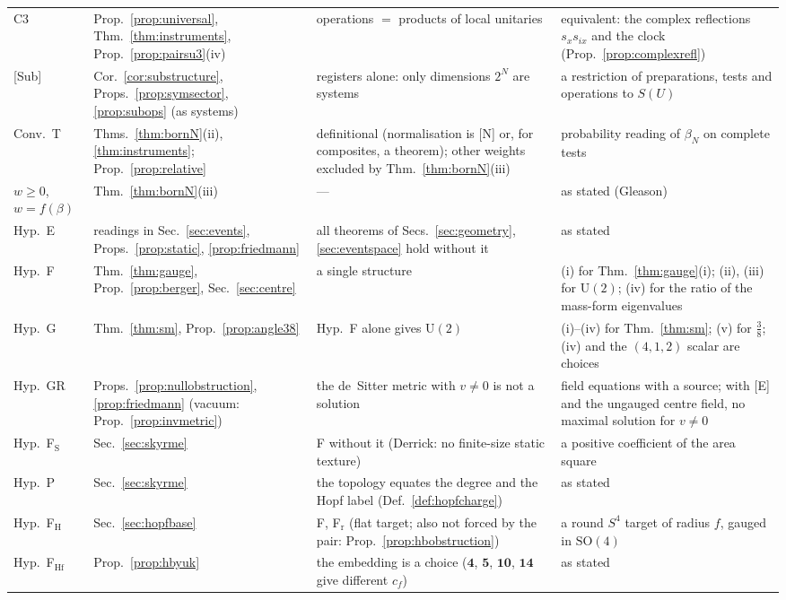 \documentclass[aps,pra,onecolumn,superscriptaddress,nofootinbib,10pt]{revtex4-2}
\theoremstyle{definition}
\theoremstyle{remark}
\newcommand{\SO}{\mathrm{SO}}
\newcommand{\U}{\mathrm{U}}
\begin{document}
\begin{table}[h]
\begin{tabular}{@{}p{}p{}p{}p{}@{}}
C3 & Prop.~\ref{prop:universal}, Thm.~\ref{thm:instruments}, Prop.~\ref{prop:pairsu3}(iv) & operations $=$ products of local unitaries & equivalent: the complex reflections $s_xs_{ix}$ and the clock (Prop.~\ref{prop:complexrefl})\\
{[Sub]} & Cor.~\ref{cor:substructure}, Props.~\ref{prop:symsector}, \ref{prop:subops} (as systems) & registers alone: only dimensions $2^N$ are systems & a restriction of preparations, tests and operations to $S(U)$\\
Conv.\ T & Thms.~\ref{thm:bornN}(ii), \ref{thm:instruments}; Prop.~\ref{prop:relative} & definitional (normalisation is [N] or, for composites, a theorem); other weights excluded by Thm.~\ref{thm:bornN}(iii) & probability reading of $\beta_N$ on complete tests\\
$w\ge0$, $w=f(\beta)$ & Thm.~\ref{thm:bornN}(iii) & --- & as stated (Gleason)\\
Hyp.\ E & readings in Sec.~\ref{sec:events}, Props.~\ref{prop:static}, \ref{prop:friedmann} & all theorems of Secs.~\ref{sec:geometry}, \ref{sec:eventspace} hold without it & as stated\\
Hyp.\ F & Thm.~\ref{thm:gauge}, Prop.~\ref{prop:berger}, Sec.~\ref{sec:centre} & a single structure & (i) for Thm.~\ref{thm:gauge}(i); (ii), (iii) for $\U(2)$; (iv) for the ratio of the mass-form eigenvalues\\
Hyp.\ G & Thm.~\ref{thm:sm}, Prop.~\ref{prop:angle38} & Hyp.~F alone gives $\U(2)$ & (i)--(iv) for Thm.~\ref{thm:sm}; (v) for $\tfrac38$; (iv) and the $(4,1,2)$ scalar are choices\\
Hyp.\ GR & Props.~\ref{prop:nullobstruction}, \ref{prop:friedmann} (vacuum: Prop.~\ref{prop:invmetric}) & the de~Sitter metric with $v\ne0$ is not a solution & field equations with a source; with [E] and the ungauged centre field, no maximal solution for $v\ne0$\\
Hyp.\ F$_{\mathrm S}$ & Sec.~\ref{sec:skyrme} & F without it (Derrick: no finite-size static texture) & a positive coefficient of the area square\\
Hyp.\ P & Sec.~\ref{sec:skyrme} & the topology equates the degree and the Hopf label (Def.~\ref{def:hopfcharge}) & as stated\\
Hyp.\ F$_{\mathrm H}$ & Sec.~\ref{sec:hopfbase} & F, F$_{\mathrm r}$ (flat target; also not forced by the pair: Prop.~\ref{prop:hbobstruction}) & a round $S^4$ target of radius $f$, gauged in $\SO(4)$\\
Hyp.\ F$_{\mathrm{Hf}}$ & Prop.~\ref{prop:hbyuk} & the embedding is a choice ($\mathbf4$, $\mathbf5$, $\mathbf{10}$, $\mathbf{14}$ give different $c_f$) & as stated\\

\end{tabular}
\end{table}
\end{document}
